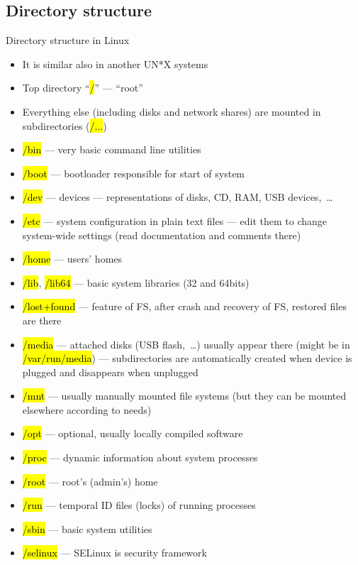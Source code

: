 \documentclass[compress, ucs, xelatex, 11pt, xcolor=svgnames, aspectratio=169,
	hyperref={
		bookmarks=true,
		unicode=true,
		colorlinks=true,
		pdftitle={Linux, command line and MetaCentrum},
		plainpages=false,
		pdfauthor={Vojtech Zeisek},
		pdfsubject={Course about use of Linux command line, writing shell scripts and using MetaCentrum of CESNET},
		pdfcreator={XeLaTeX},
		pdfkeywords={Linux, GNU, BASH, shell, command line, MetaCentrum},
		linkcolor=DarkRed, %
		anchorcolor=DarkBlue, %
		citecolor=Indigo, %
		filecolor=NavyBlue, %
		menucolor=DarkMagenta, %
		urlcolor=DarkBlue, %
		pdftex},
	url={hyphens, lowtilde} %
	]{beamer}
\renewcommand{\texttt}[1]{\hl{\ttfamily #1}}
\renewcommand{\alert}[1]{\textcolor{red}{#1}}
\begin{document}
\subsection{Directory structure}

\begin{frame}[allowframebreaks]{Directory structure in Linux}
	\begin{itemize}
		\item It is similar also in another UN*X systems
		\item Top directory \enquote{\texttt{/}} --- \enquote{root}
		\item Everything else (including disks and network shares) are mounted in subdirectories (\texttt{/...})
		\item \texttt{/bin} --- very basic command line utilities
		\item \texttt{/boot} --- bootloader responsible for start of system
		\item \texttt{/dev} --- devices --- representations of disks, CD, RAM, USB devices,~\ldots
		\item \alert{\texttt{/etc}} --- system configuration in plain text files --- edit them to change system-wide settings (read documentation and comments there)
		\item \alert{\texttt{/home}} --- users' homes
		\item \texttt{/lib}, \texttt{/lib64} --- basic system libraries (32 and 64bits)
		\item \texttt{/lost+found} --- feature of FS, after crash and recovery of FS, restored files are there
		\item \alert{\texttt{/media}} --- attached disks (USB flash,~\ldots) usually appear there (might be in \texttt{/var/run/media}) --- subdirectories are automatically created when device is plugged and disappears when unplugged
		\item \texttt{/mnt} --- usually manually mounted file systems (but they can be mounted elsewhere according to needs)
		\item \texttt{/opt} --- optional, usually locally compiled software
		\item \texttt{/proc} --- dynamic information about system processes
		\item \texttt{/root} --- root's (admin's) home
		\item \texttt{/run} --- temporal ID files (locks) of running processes
		\item \texttt{/sbin} --- basic system utilities
		\item \texttt{/selinux} --- SELinux is security framework

\end{itemize}
\end{frame}
\end{document}
